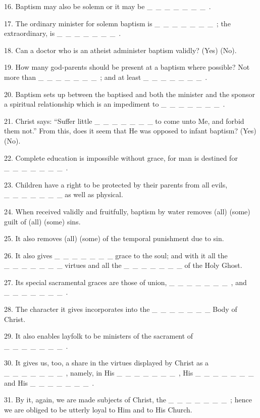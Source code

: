 \documentclass[a5paper]{article}
\newcommand\textjarman[1]{{\jarman #1}}
\begin{document}
16. Baptism may also be solemn or it may be  \_~\_~\_~\_~\_~\_~\_~.

17. The ordinary minister for solemn baptism is  \_~\_~\_~\_~\_~\_~\_~; the extraordinary, is  \_~\_~\_~\_~\_~\_~\_~.

18. Can a doctor who is an atheist administer baptism validly? (\textjarman{Yes}) (\textjarman{No}).

19. How many god-parents should be present at a baptism where possible? Not more than  \_~\_~\_~\_~\_~\_~\_~; and at least  \_~\_~\_~\_~\_~\_~\_~.

20. Baptism sets up between the baptised and both the minister and the sponsor a spiritual relationship which is an impediment to  \_~\_~\_~\_~\_~\_~\_~.

21. Christ says: “Suffer little  \_~\_~\_~\_~\_~\_~\_  to come unto Me, and forbid them not.” From this, does it seem that He was opposed to infant baptism? (\textjarman{Yes}) (\textjarman{No}).

22. Complete education is impossible without grace, for man is destined for  \_~\_~\_~\_~\_~\_~\_~.

23. Children have a right to be protected by their parents from all evils,  \_~\_~\_~\_~\_~\_~\_  as well as physical.

24. When received validly and fruitfully, baptism by water removes (\textjarman{all}) (\textjarman{some}) guilt of (\textjarman{all}) (\textjarman{some}) sins.

25. It also removes (\textjarman{all}) (\textjarman{some}) of the temporal punishment due to sin.

26. It also gives  \_~\_~\_~\_~\_~\_~\_  grace to the soul; and with it all the  \_~\_~\_~\_~\_~\_~\_  virtues and all the  \_~\_~\_~\_~\_~\_~\_  of the Holy Ghost.

27. Its special sacramental graces are those of union,  \_~\_~\_~\_~\_~\_~\_~, and  \_~\_~\_~\_~\_~\_~\_~.

28. The character it gives incorporates into the  \_~\_~\_~\_~\_~\_~\_  Body of Christ.

29. It also enables layfolk to be ministers of the sacrament of  \_~\_~\_~\_~\_~\_~\_~.

30. It gives us, too, a share in the virtues displayed by Christ as a  \_~\_~\_~\_~\_~\_~\_~, namely, in His  \_~\_~\_~\_~\_~\_~\_~, His  \_~\_~\_~\_~\_~\_~\_  and His  \_~\_~\_~\_~\_~\_~\_~.

31. By it, again, we are made subjects of Christ, the  \_~\_~\_~\_~\_~\_~\_~; hence we are obliged to be utterly loyal to Him and to His Church. 
\end{document}
